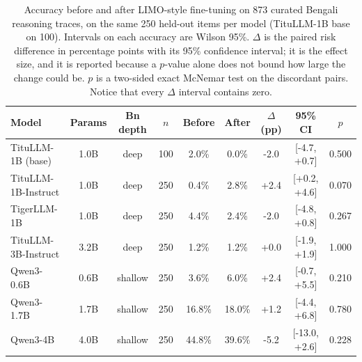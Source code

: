 \documentclass[10pt,twocolumn,letterpaper]{article}
\begin{document}
\begin{table}[t]
\caption{Accuracy before and after LIMO-style fine-tuning on 873 curated
Bengali reasoning traces, on the same 250 held-out items per model
(TituLLM-1B base on 100). Intervals on each accuracy are Wilson 95\%.
$\Delta$ is the paired risk difference in percentage points with its 95\%
confidence interval; it is the effect size, and it is reported because a
$p$-value alone does not bound how large the change could be. $p$ is a
two-sided exact McNemar test on the discordant pairs. Notice that every
$\Delta$ interval contains zero.}
\label{tab:main}
\centering\small
\begin{tabular}{|l|c|c|c|c|c|c|c|c|}
\hline
\textbf{Model} & \textbf{Params} & \textbf{Bn depth} & \textbf{$n$} & \textbf{Before} & \textbf{After} & \textbf{$\Delta$ (pp)} & \textbf{95\% CI} & \textbf{$p$} \\
\hline
TituLLM-1B (base) & 1.0B & deep & 100 & 2.0\% & 0.0\% & -2.0 & [-4.7, +0.7] & 0.500 \\
TituLLM-1B-Instruct & 1.0B & deep & 250 & 0.4\% & 2.8\% & +2.4 & [+0.2, +4.6] & 0.070 \\
TigerLLM-1B & 1.0B & deep & 250 & 4.4\% & 2.4\% & -2.0 & [-4.8, +0.8] & 0.267 \\
TituLLM-3B-Instruct & 3.2B & deep & 250 & 1.2\% & 1.2\% & +0.0 & [-1.9, +1.9] & 1.000 \\
Qwen3-0.6B & 0.6B & shallow & 250 & 3.6\% & 6.0\% & +2.4 & [-0.7, +5.5] & 0.210 \\
Qwen3-1.7B & 1.7B & shallow & 250 & 16.8\% & 18.0\% & +1.2 & [-4.4, +6.8] & 0.780 \\
Qwen3-4B & 4.0B & shallow & 250 & 44.8\% & 39.6\% & -5.2 & [-13.0, +2.6] & 0.228 \\
\hline
\end{tabular}
\end{table}
\end{document}
